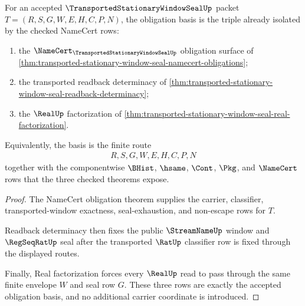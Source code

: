 \begin{theorem}
\label{thm:transported-stationary-window-seal-checked-obligation-basis}
For an accepted $\TransportedStationaryWindowSealUp$ packet $T=(R,S,G,W,E,H,C,P,N)$, the obligation basis is the triple already isolated by the checked NameCert rows:
\begin{enumerate}
\item the $\NameCert_{\TransportedStationaryWindowSealUp}$ obligation surface of \autoref{thm:transported-stationary-window-seal-namecert-obligations};
\item the transported readback determinacy of \autoref{thm:transported-stationary-window-seal-readback-determinacy};
\item the $\RealUp$ factorization of \autoref{thm:transported-stationary-window-seal-real-factorization}.
\end{enumerate}
Equivalently, the basis is the finite route
$$
\begin{aligned}
  R,S,G,W,E,H,C,P,N
\end{aligned}
$$
together with the componentwise $\BHist$, $\hsame$, $\Cont$, $\Pkg$, and $\NameCert$ rows that the three checked theorems expose.
\end{theorem}
\begin{proof}
The NameCert obligation theorem supplies the carrier, classifier, transported-window exactness, seal-exhaustion, and non-escape rows for $T$.

Readback determinacy then fixes the public $\StreamNameUp$ window and $\RegSeqRatUp$ seal after the transported $\RatUp$ classifier row is fixed through the displayed routes.

Finally, Real factorization forces every $\RealUp$ read to pass through the same finite envelope $W$ and seal row $G$. These three rows are exactly the accepted obligation basis, and no additional carrier coordinate is introduced.
\end{proof}

